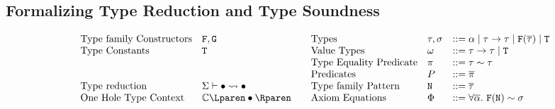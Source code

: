 \documentclass[format=acmsmall,manuscript,review,screen,nonacm,margin=1in,11pt]{acmart}
\begin{document}
\subsection{Formalizing Type Reduction and Type Soundness}\label{subsec:tf-closed-formal}
\begin{figure}[ht]
    \footnotesize
  \[
    \begin{array}{l l l}
      &\text{Type family Constructors} & \FamCtrs,\MoreFamCtrs\\
      &\text{Type Constants} &\texttt{\TypeCtrs}\\
      \\
      \\
      &\text{Type reduction}              &\tystepsto\GEnv\bullet\bullet
      \\
      &\text{One Hole Type Context}    &\TEvalCtxt{\bullet}
    \end{array}
    \begin{array}{l l l l l}
      &\text{Types}           &\tau,\sigma  &\bnfeq \alpha \bnfor \tau\to\tau %
                                              \bnfor \FamCtrs(\many\tau) \bnfor \TypeCtrs\\%
      &\text{Value Types}    &\GTy         &\bnfeq \tau\to\tau \bnfor \TypeCtrs\\
      &\text{Type Equality Predicate}      &\pi          &\bnfeq \tau\teq\tau\\
      &\text{Predicates}     &\Preds       &\bnfeq \many\pi\\
      &\text{Type family Pattern}     &\texttt{\FamPattern} &\bnfeq \many\tau\\
      &\text{Axiom Equations} &\AxiomEq     &\bnfeq \Forall{\many\alpha}{\FamCtrs(\FamPattern) \teq \sigma}\\

\end{array}\]
\end{figure}
\end{document}
